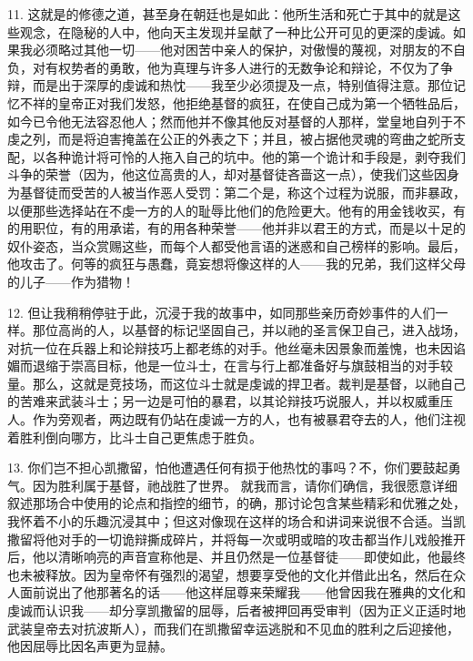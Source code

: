 11. 这就是的修德之道，甚至身在朝廷也是如此：他所生活和死亡于其中的就是这些观念，在隐秘的人中，他向天主发现并呈献了一种比公开可见的更深的虔诚。如果我必须略过其他一切——他对困苦中亲人的保护，对傲慢的蔑视，对朋友的不自负，对有权势者的勇敢，他为真理与许多人进行的无数争论和辩论，不仅为了争辩，而是出于深厚的虔诚和热忱——我至少必须提及一点，特别值得注意。那位记忆不祥的皇帝正对我们发怒，他拒绝基督的疯狂，在使自己成为第一个牺牲品后，如今已令他无法容忍他人；然而他并不像其他反对基督的人那样，堂皇地自列于不虔之列，而是将迫害掩盖在公正的外表之下；并且，被占据他灵魂的弯曲之蛇所支配，以各种诡计将可怜的人拖入自己的坑中。他的第一个诡计和手段是，剥夺我们斗争的荣誉（因为，他这位高贵的人，却对基督徒吝啬这一点），使我们这些因身为基督徒而受苦的人被当作恶人受罚：第二个是，称这个过程为说服，而非暴政，以便那些选择站在不虔一方的人的耻辱比他们的危险更大。他有的用金钱收买，有的用职位，有的用承诺，有的用各种荣誉——他并非以君王的方式，而是以十足的奴仆姿态，当众赏赐这些，而每个人都受他言语的迷惑和自己榜样的影响。最后，他攻击了。何等的疯狂与愚蠢，竟妄想将像这样的人——我的兄弟，我们这样父母的儿子——作为猎物！\par

12. 但让我稍稍停驻于此，沉浸于我的故事中，如同那些亲历奇妙事件的人们一样。那位高尚的人，以基督的标记坚固自己，并以祂的圣言保卫自己，进入战场，对抗一位在兵器上和论辩技巧上都老练的对手。他丝毫未因景象而羞愧，也未因谄媚而退缩于崇高目标，他是一位斗士，在言与行上都准备好与旗鼓相当的对手较量。那么，这就是竞技场，而这位斗士就是虔诚的捍卫者。裁判是基督，以祂自己的苦难来武装斗士；另一边是可怕的暴君，以其论辩技巧说服人，并以权威重压人。作为旁观者，两边既有仍站在虔诚一方的人，也有被暴君夺去的人，他们注视着胜利倒向哪方，比斗士自己更焦虑于胜负。\par

13. 你们岂不担心凯撒留，怕他遭遇任何有损于他热忱的事吗？不，你们要鼓起勇气。因为胜利属于基督，祂战胜了世界。 就我而言，请你们确信，我很愿意详细叙述那场合中使用的论点和指控的细节，的确，那讨论包含某些精彩和优雅之处，我怀着不小的乐趣沉浸其中；但这对像现在这样的场合和讲词来说很不合适。当凯撒留将他对手的一切诡辩撕成碎片，并将每一次或明或暗的攻击都当作儿戏般推开后，他以清晰响亮的声音宣称他是、并且仍然是一位基督徒——即使如此，他最终也未被释放。因为皇帝怀有强烈的渴望，想要享受他的文化并借此出名，然后在众人面前说出了他那著名的话——他这样屈尊来荣耀我——他曾因我在雅典的文化和虔诚而认识我——却分享凯撒留的屈辱，后者被押回再受审判（因为正义正适时地武装皇帝去对抗波斯人），而我们在凯撒留幸运逃脱和不见血的胜利之后迎接他，他因屈辱比因名声更为显赫。\par


